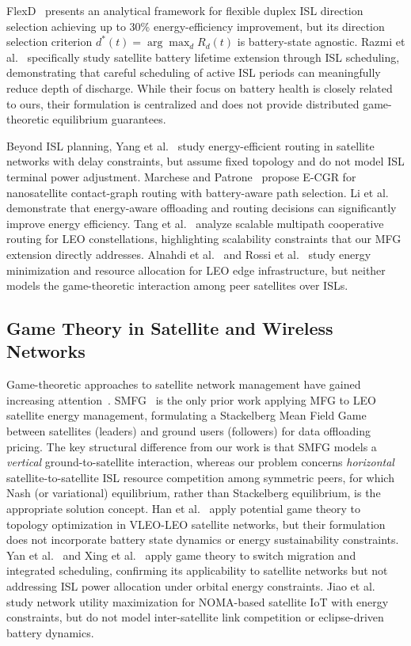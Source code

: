\documentclass[journal]{IEEEtran}
\begin{document}
FlexD~\cite{lokugama2026flexd} presents an analytical framework for flexible duplex ISL direction selection achieving up to 30\% energy-efficiency improvement, but its direction selection criterion $d^*(t)=\arg\max_d R_d(t)$ is battery-state agnostic. Razmi et al.~\cite{razmi2026battery} specifically study satellite battery lifetime extension through ISL scheduling, demonstrating that careful scheduling of active ISL periods can meaningfully reduce depth of discharge. While their focus on battery health is closely related to ours, their formulation is centralized and does not provide distributed game-theoretic equilibrium guarantees.

Beyond ISL planning, Yang et al.~\cite{yang2016energyrouting} study energy-efficient routing in satellite networks with delay constraints, but assume fixed topology and do not model ISL terminal power adjustment. Marchese and Patrone~\cite{marchese2020ecgr} propose E-CGR for nanosatellite contact-graph routing with battery-aware path selection. Li et al.~\cite{li2020energyeff} demonstrate that energy-aware offloading and routing decisions can significantly improve energy efficiency. Tang et al.~\cite{tang2019multipath} analyze scalable multipath cooperative routing for LEO constellations, highlighting scalability constraints that our MFG extension directly addresses. Alnahdi et al.~\cite{alnahdi2025minimizing} and Rossi et al.~\cite{rossi2025resource} study energy minimization and resource allocation for LEO edge infrastructure, but neither models the game-theoretic interaction among peer satellites over ISLs.

\subsection{Game Theory in Satellite and
Wireless Networks}

Game-theoretic approaches to satellite network management have gained increasing attention~\cite{jiang2024gametheory}. SMFG~\cite{wang2023smfg} is the only prior work applying MFG to LEO satellite energy management, formulating a Stackelberg Mean Field Game between satellites (leaders) and ground users (followers) for data offloading pricing. The key structural difference from our work is that SMFG models a \emph{vertical} ground-to-satellite interaction, whereas our problem concerns
\emph{horizontal} satellite-to-satellite ISL
resource competition among symmetric peers, for which Nash (or variational) equilibrium, rather than Stackelberg equilibrium, is the appropriate solution concept. Han et al.~\cite{han2024topology} apply potential game theory to topology optimization in VLEO-LEO satellite networks, but their formulation does not incorporate battery state dynamics or energy sustainability constraints. Yan et al.~\cite{yan2024switchmigration} and Xing et al.~\cite{xing2026matching} apply game theory to switch migration and integrated scheduling, confirming its applicability to satellite networks but not addressing ISL power allocation under orbital energy constraints. Jiao et al.~\cite{jiao2020noma} study network utility maximization for NOMA-based satellite IoT with energy constraints, but do not model inter-satellite link competition or eclipse-driven battery dynamics.
\end{document}
